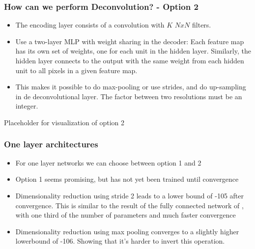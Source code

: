 \documentclass{beamer}
\begin{document}
\begin{frame}
\frametitle{How can we perform Deconvolution? - Option 2}

\begin{itemize}
\item The encoding layer consists of a convolution with $K$ $NxN$ filters.
\item Use a two-layer MLP with weight sharing in the decoder: Each feature map has its own set of weights, one for each unit in the hidden layer. Similarly, the hidden layer connects to the output with the same weight from each hidden unit to all pixels in a given feature map.
\item This makes it possible to do max-pooling or use strides, and do up-sampling in de deconvolutional layer. The factor between two resolutions must be an integer.
\end{itemize}



\end{frame}

\begin{frame}
Placeholder for visualization of option 2
\end{frame}

\begin{frame}
\frametitle{One layer architectures}

\begin{itemize}
	\item For one layer networks we can choose between option 1 and 2
	\item Option 1 seems promising, but has not yet been trained until convergence
	\item Dimensionality reduction using stride 2 leads to a lower bound of -105 after convergence. This is similar to the result of the fully connected network of \cite{kingma2013stochastic}, with one third of the number of parameters and much faster convergence
	\item Dimensionality reduction using max pooling converges to a slightly higher lowerbound of -106. Showing that it's  harder to invert this operation.
	\end{itemize}
\end{frame}
\end{document}
